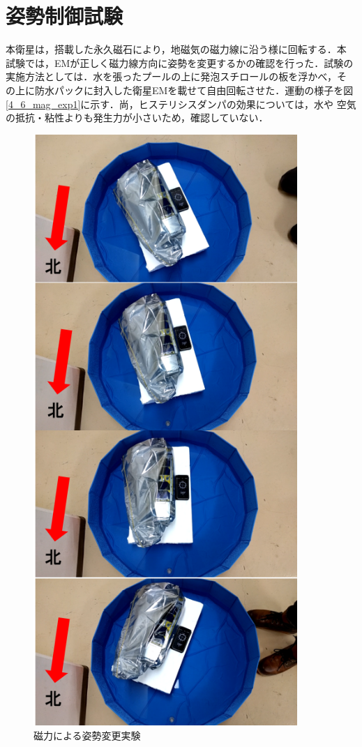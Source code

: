 \section{姿勢制御試験}

本衛星は，搭載した永久磁石により，地磁気の磁力線に沿う様に回転する．本
試験では，EMが正しく磁力線方向に姿勢を変更するかの確認を行った．試験の
実施方法としては．水を張ったプールの上に発泡スチロールの板を浮かべ，そ
の上に防水パックに封入した衛星EMを載せて自由回転させた．運動の様子を図
\ref{4_6_mag_exp1}に示す．尚，ヒステリシスダンパの効果については，水や
空気の抵抗・粘性よりも発生力が小さいため，確認していない．


\begin{figure}[htbp]
	\centering
	\includegraphics[width=10cm]{./04/fig/4_6_mag1.png}
	\caption{磁力による姿勢変更実験}
	\label{4_6_mag_exp}
\end{figure}
